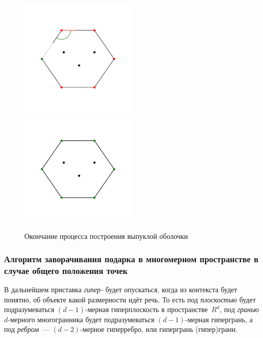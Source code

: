 \documentclass[14pt]{extarticle}
\begin{document}
\begin{figure}[t]
  \centering

  {}\hfill
  \hspace*{-0.04\textwidth}\includegraphics[width=0.5\textwidth]{gift13.pdf}
  \hfill
  \hspace*{-0.04\textwidth}\includegraphics[width=0.5\textwidth]{gift14.pdf}
  \hfill{}

  \vspace*{-7ex}

  \caption{Окончание процесса построения выпуклой оболочки}
  \label{fig:2D_7}
\end{figure}

\subsubsection{Алгоритм заворачивания подарка в многомерном пространстве в случае общего положения точек}
\label{sec:gw3d}

В дальнейшем приставка \emph{гипер-} будет опускаться, когда из контекста будет понятно, об объекте какой размерности идёт речь. То есть под \emph{плоскостью} будет подразумеваться $(d-1)$-мерная гиперплоскость в пространстве~$R^d$, под \emph{гранью} $d$-мерного многогранника будет подразумеваться $(d-1)$-мерная гипергрань, а под \emph{ребром}~--- $(d-2)$-мерное гиперребро, или гипергрань (гипер)грани.
\end{document}
